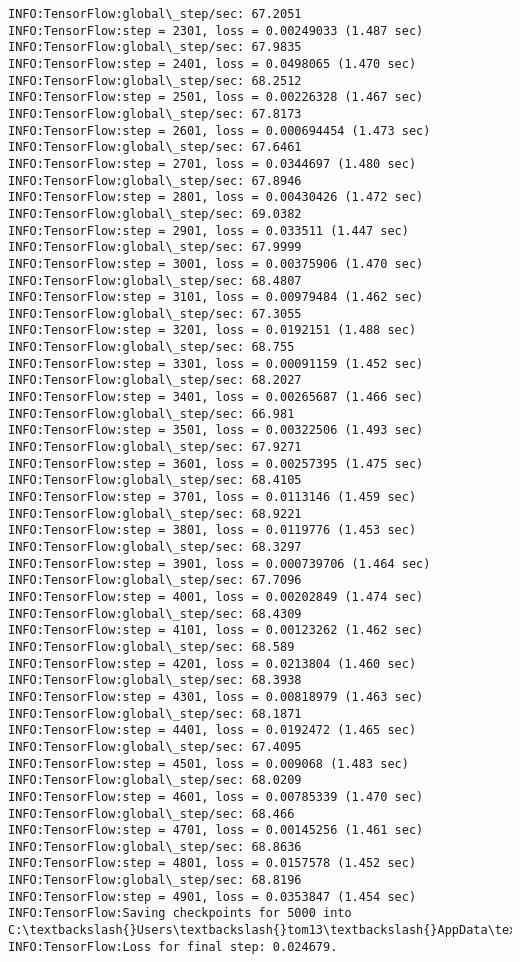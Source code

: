 \documentclass[11pt]{article}
\begin{document}
\begin{Verbatim}[commandchars=\\\{\}]
INFO:TensorFlow:global\_step/sec: 67.2051
INFO:TensorFlow:step = 2301, loss = 0.00249033 (1.487 sec)
INFO:TensorFlow:global\_step/sec: 67.9835
INFO:TensorFlow:step = 2401, loss = 0.0498065 (1.470 sec)
INFO:TensorFlow:global\_step/sec: 68.2512
INFO:TensorFlow:step = 2501, loss = 0.00226328 (1.467 sec)
INFO:TensorFlow:global\_step/sec: 67.8173
INFO:TensorFlow:step = 2601, loss = 0.000694454 (1.473 sec)
INFO:TensorFlow:global\_step/sec: 67.6461
INFO:TensorFlow:step = 2701, loss = 0.0344697 (1.480 sec)
INFO:TensorFlow:global\_step/sec: 67.8946
INFO:TensorFlow:step = 2801, loss = 0.00430426 (1.472 sec)
INFO:TensorFlow:global\_step/sec: 69.0382
INFO:TensorFlow:step = 2901, loss = 0.033511 (1.447 sec)
INFO:TensorFlow:global\_step/sec: 67.9999
INFO:TensorFlow:step = 3001, loss = 0.00375906 (1.470 sec)
INFO:TensorFlow:global\_step/sec: 68.4807
INFO:TensorFlow:step = 3101, loss = 0.00979484 (1.462 sec)
INFO:TensorFlow:global\_step/sec: 67.3055
INFO:TensorFlow:step = 3201, loss = 0.0192151 (1.488 sec)
INFO:TensorFlow:global\_step/sec: 68.755
INFO:TensorFlow:step = 3301, loss = 0.00091159 (1.452 sec)
INFO:TensorFlow:global\_step/sec: 68.2027
INFO:TensorFlow:step = 3401, loss = 0.00265687 (1.466 sec)
INFO:TensorFlow:global\_step/sec: 66.981
INFO:TensorFlow:step = 3501, loss = 0.00322506 (1.493 sec)
INFO:TensorFlow:global\_step/sec: 67.9271
INFO:TensorFlow:step = 3601, loss = 0.00257395 (1.475 sec)
INFO:TensorFlow:global\_step/sec: 68.4105
INFO:TensorFlow:step = 3701, loss = 0.0113146 (1.459 sec)
INFO:TensorFlow:global\_step/sec: 68.9221
INFO:TensorFlow:step = 3801, loss = 0.0119776 (1.453 sec)
INFO:TensorFlow:global\_step/sec: 68.3297
INFO:TensorFlow:step = 3901, loss = 0.000739706 (1.464 sec)
INFO:TensorFlow:global\_step/sec: 67.7096
INFO:TensorFlow:step = 4001, loss = 0.00202849 (1.474 sec)
INFO:TensorFlow:global\_step/sec: 68.4309
INFO:TensorFlow:step = 4101, loss = 0.00123262 (1.462 sec)
INFO:TensorFlow:global\_step/sec: 68.589
INFO:TensorFlow:step = 4201, loss = 0.0213804 (1.460 sec)
INFO:TensorFlow:global\_step/sec: 68.3938
INFO:TensorFlow:step = 4301, loss = 0.00818979 (1.463 sec)
INFO:TensorFlow:global\_step/sec: 68.1871
INFO:TensorFlow:step = 4401, loss = 0.0192472 (1.465 sec)
INFO:TensorFlow:global\_step/sec: 67.4095
INFO:TensorFlow:step = 4501, loss = 0.009068 (1.483 sec)
INFO:TensorFlow:global\_step/sec: 68.0209
INFO:TensorFlow:step = 4601, loss = 0.00785339 (1.470 sec)
INFO:TensorFlow:global\_step/sec: 68.466
INFO:TensorFlow:step = 4701, loss = 0.00145256 (1.461 sec)
INFO:TensorFlow:global\_step/sec: 68.8636
INFO:TensorFlow:step = 4801, loss = 0.0157578 (1.452 sec)
INFO:TensorFlow:global\_step/sec: 68.8196
INFO:TensorFlow:step = 4901, loss = 0.0353847 (1.454 sec)
INFO:TensorFlow:Saving checkpoints for 5000 into C:\textbackslash{}Users\textbackslash{}tom13\textbackslash{}AppData\textbackslash{}Local\textbackslash{}Temp\textbackslash{}tmp97az0nju\textbackslash{}model.ckpt.
INFO:TensorFlow:Loss for final step: 0.024679.

    \end{Verbatim}
\end{document}
